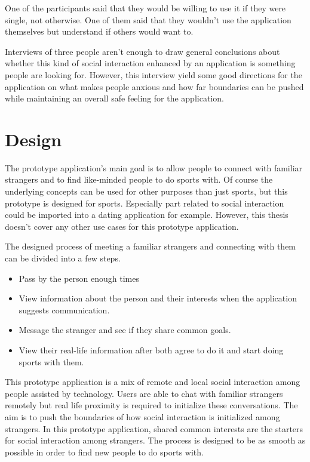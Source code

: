 One of the participants said that they would be willing to use it if they were single, not otherwise. One of them said that they wouldn't use the application themselves but understand if others would want to.

Interviews of three people aren't enough to draw general conclusions about whether this kind of social interaction enhanced by an application is something people are looking for. However, this interview yield some good directions for the application on what makes people anxious and how far boundaries can be pushed while maintaining an overall safe feeling for the application.

\section{Design}

The prototype application's main goal is to allow people to connect with familiar strangers and to find like-minded people to do sports with. Of course the underlying concepts can be used for other purposes than just sports, but this prototype is designed for sports. Especially part related to social interaction could be imported into a dating application for example. However, this thesis doesn't cover any other use cases for this prototype application.

The designed process of meeting a familiar strangers and connecting with them can be divided into a few steps.

\begin{itemize}
	\item Pass by the person enough times
	\item View information about the person and their interests when the application suggests communication.
	\item Message the stranger and see if they share common goals.
	\item View their real-life information after both agree to do it and start doing sports with them.
\end{itemize}

This prototype application is a mix of remote and local social interaction among people assisted by technology. Users are able to chat with familiar strangers remotely but real life proximity is required to initialize these conversations. The aim is to push the boundaries of how social interaction is initialized among strangers. In this prototype application, shared common interests are the starters for social interaction among strangers. The process is designed to be as smooth as possible in order to find new people to do sports with.

